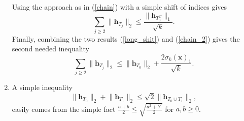 \documentclass[11pt,oneside,czech,american]{book} %
\theoremstyle{definition} %
\theoremstyle{definition}
\begin{document}
\begin{enumerate}
Using the approach as in (\ref{chain}) with a simple shift of indices gives
\begin{equation}
	\sum_{j\geq 2} \lVert \bm{h}_{T_j} \rVert_2 \leq \frac{\lVert \bm{h}_{T^C_0} \rVert_1}{\sqrt{k}}.
	\label{chain_2}
\end{equation}
Finally, combining the two results (\ref{long_shit}) and (\ref{chain_2}) gives the second needed inequality
\begin{equation}
	\sum_{j\geq 2} \lVert \bm{h}_{T_j} \rVert_2 \leq \lVert \bm{h}_{T_0} \rVert_2 + \frac{ 2\sigma_k(\bm{x})_1}{\sqrt{k}}.
	\label{second_needed}
\end{equation}
\item A simple inequality
\begin{equation}
	\lVert \bm{h}_{T_0} \rVert_2 + \lVert \bm{h}_{T_1} \rVert_2 \leq \sqrt{2} \lVert \bm{h}_{T_0 \cup T_1} \rVert_2,
	\label{simple_shit}
\end{equation}
easily comes from the simple fact $\frac{a+b}{2} \leq \sqrt{\frac{a^2 + b^2}{2}}$ for $a,b \geq 0$.
\end{enumerate}
\end{document}
